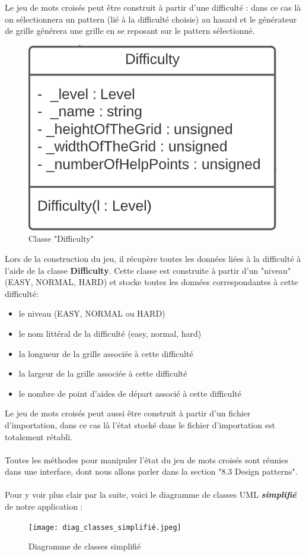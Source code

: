 \documentclass [ 11 pt ] {article}
\begin{document}
    Le jeu de mots croisés peut être construit à partir d’une difficulté : dans ce cas là on sélectionnera un pattern (lié à la difficulté choisie) au hasard et le générateur de grille générera une grille en se reposant sur le pattern sélectionné.
    \begin{figure}[H] 
    \center 
    \includegraphics[width=0.3\linewidth]{difficulty_uml.png}
    \caption{Classe "Difficulty"}
    \end{figure}
    Lors de la construction du jeu, il récupère toutes les données liées à la difficulté à l’aide de la classe \textbf{Difficulty}. Cette classe est construite à partir d’un "niveau" (EASY, NORMAL, HARD) et stocke toutes les données correspondantes à cette difficulté:
    \begin{itemize}
        \item le niveau (EASY, NORMAL ou HARD)
        \item le nom littéral de la difficulté (\guillemotleft easy\guillemotright, \guillemotleft normal\guillemotright, \guillemotleft hard\guillemotright)
        \item la longueur de la grille associée à cette difficulté
        \item la largeur de la grille associée à cette difficulté
        \item le nombre de point d’aides de départ associé à cette difficulté
    \end{itemize}
    Le jeu de mots croisés peut aussi être construit à partir d’un fichier d’importation, dans ce cas là l’état stocké dans le fichier d’importation est totalement rétabli.
    \\\\
    Toutes les méthodes pour manipuler l’état du jeu de mots croisés sont réunies dans une interface, dont nous allons parler dans la section "8.3 Design patterns".
    \\\\
    Pour y voir plus clair par la suite, voici le diagramme de classes UML \textbf{\textit{simplifié}} de notre application :
    \begin{figure}[H] 
    \center 
    \texttt{[image: diag\_classes\_simplifié.jpeg]}
    \caption{Diagramme de classes simplifié}
    \end{figure}
    
\end{document}
